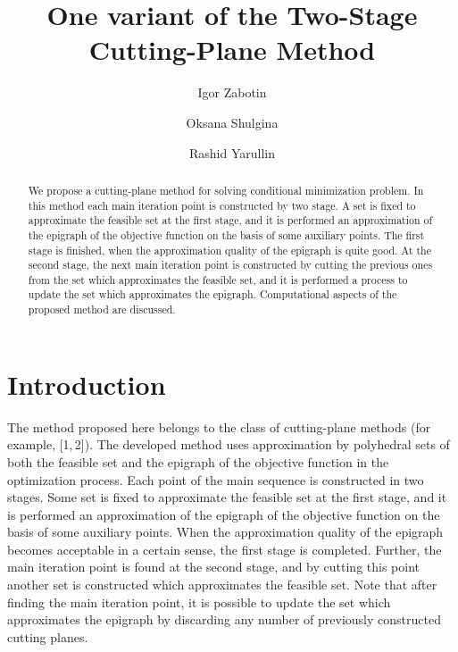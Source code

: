 \documentclass[12pt]{llncs}
\begin{document}
%
\fi

\title{One variant of the Two-Stage Cutting-Plane Method}
\author{Igor Zabotin 
  \and
  Oksana Shulgina 
  \and
  Rashid Yarullin 
}

\maketitle

\begin{abstract}
We propose a cutting-plane method for solving conditional minimization problem. In this method each main iteration point is constructed by two stage. 
A set is fixed to approximate the feasible set at the first stage, and it is performed an approximation of the epigraph of the objective function on the basis of some auxiliary points. 
The first stage is finished, when the approximation quality of the epigraph is quite good. 
At the second stage, the next main iteration point is constructed by cutting the previous ones from the set which approximates the feasible set, and it is performed a process to update the set which approximates the epigraph. 
Computational aspects of the proposed method are discussed.

\end{abstract}

\section{Introduction}
The method proposed here belongs to the class of cutting-plane methods (for example, [1,\,2]).
The developed method uses approximation by polyhedral sets of both the feasible set and the epigraph of the objective function in the optimization process. 
Each point of the main sequence is constructed in two stages. 
Some set is fixed to approximate the feasible set at the first stage, and it is performed an approximation of the epigraph of the objective function on the basis of some auxiliary points.
When the approximation quality of the epigraph becomes acceptable in a certain sense, the first stage is completed. 
Further, the main iteration point is found at the second stage, and by cutting this point another set is constructed which approximates the feasible set.
Note that after finding the main iteration point, it is possible to update the set which approximates the epigraph by discarding any number of previously constructed cutting planes.
\end{document}
